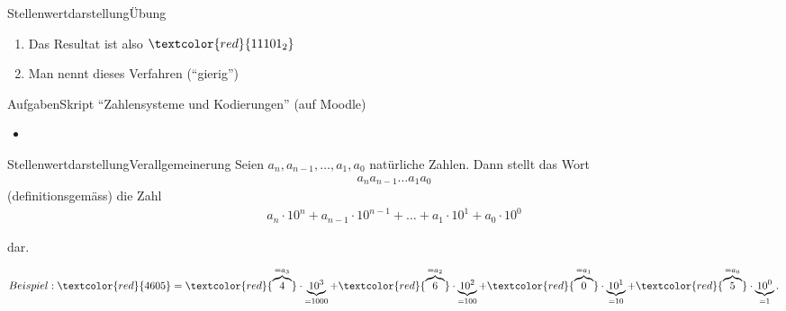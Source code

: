 \begin{frame}{Stellenwertdarstellung}{Übung}
\begin{enumerate}
{\begin{align*}
        \textcolor{red}{a_3}\cdot \underbrace{2^3}_{=8} + 
        \textcolor{red}{a_2}\cdot \underbrace{2^2}_{=4} +
        \textcolor{red}{a_1}\cdot \underbrace{2^1}_{=2} + 
        \textcolor{red}{a_0}\cdot \underbrace{2^0}_{=1}.
    \end{align*}
    }
    \item<7-> Das Resultat ist also $\textcolor{red}{11101_2}$
    \item<8-> Man nennt dieses Verfahren  (``gierig'')
    
    
\end{enumerate}
\end{frame}

\begin{frame}{Aufgaben}{Skript ``Zahlensysteme und Kodierungen'' (auf Moodle)}
\begin{itemize}
    \item {}
\end{itemize}
\end{frame}


\begin{frame}{Stellenwertdarstellung}{Verallgemeinerung}
    Seien $a_n,a_{n-1},\ldots,a_1,a_0$ natürliche Zahlen. Dann stellt das Wort
    \begin{align*}
        a_na_{n-1}\ldots a_1a_0
    \end{align*}
    (definitionsgemäss) die Zahl
    \begin{align*}
        a_n\cdot 10^n + a_{n-1}\cdot 10^{n-1}+\ldots + a_1\cdot 10^1 + a_0\cdot 10^0
    \end{align*}

    dar.

    
\begin{align*}
    Beispiel: \textcolor{red}{4605} = \textcolor{red}{\overbrace{4}^{=a_3}}\cdot \underbrace{10^3}_{=1000} + \textcolor{red}{\overbrace{6}^{=a_2}}\cdot \underbrace{10^2}_{=100} + \textcolor{red}{\overbrace{0}^{=a_1}}\cdot \underbrace{10^1}_{=10} + \textcolor{red}{\overbrace{5}^{=a_0}}\cdot \underbrace{10^0}_{=1}.
\end{align*}

\end{frame}



